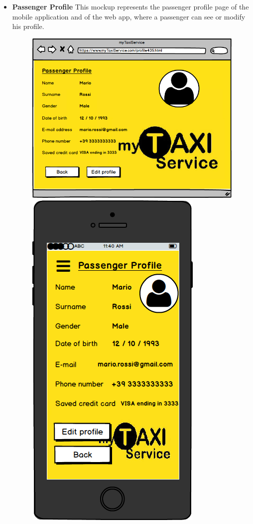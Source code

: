 \documentclass[18pt,oneside,a4paper, titlepage]{article}
\begin{document}
\begin{itemize}
\begin{figure}[h]
				\end{figure}
				\\ \\
				\item \textbf{Passenger Profile} This mockup represents the passenger profile page of the mobile application and of the web app, where a passenger can see or modify his profile.\\
				\begin{figure}[h]
					\includegraphics[scale=0.3]{WebAppPassengerProfile.png}%
					\qquad\qquad
					\includegraphics[scale=0.3]{MobileAppPassengerProfile.png}

\end{figure}
\end{itemize}
\end{document}

